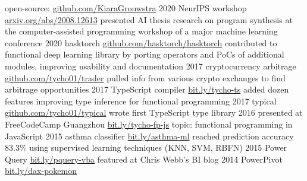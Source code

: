 \documentclass[]{friggeri-cv}
\begin{document}
\begin{entrylist}
\entry
    {}
    {open-source: }
    {\href{https://www.github.com/KiaraGrouwstra}{github.com/KiaraGrouwstra}}
    {}
   \entry
     {2020}
     {NeurIPS workshop}
     {\href{https://arxiv.org/abs/2008.12613}{arxiv.org/abs/2008.12613}}
     {
         presented AI thesis research on program synthesis at the computer-assisted programming workshop of a major machine learning conference
     }
  \entry
    {2020}
    {hasktorch}
    {\href{https://github.com/hasktorch/hasktorch}{github.com/hasktorch/hasktorch}}
    {
      contributed to functional deep learning library by porting operators and PoCs of additional modules, improving usability and documentation
    }
  \entry
    {2017}
    {cryptocurrency arbitrage}
    {\href{https://github.com/KiaraGrouwstra/trader}{github.com/tycho01/trader}}
    {
      pulled info from various crypto exchanges to find arbitrage opportunities
    }
  \entry
    {2017}
    {TypeScript compiler}
    {\href{https://github.com/Microsoft/TypeScript/pulls/KiaraGrouwstra}{bit.ly/tycho-ts}}
    {
      added dozen features improving type inference for functional programming
    }
  \entry
    {2017}
    {typical}
    {\href{https://github.com/KiaraGrouwstra/typical}{github.com/tycho01/typical}}
    {
      wrote first TypeScript type library
    }
  \entry
    {2016}
    {%
presented at
      FreeCodeCamp Guangzhou
    }
    {\href{https://www.slideshare.net/TychoGrouwstra/fp-in-js}{bit.ly/tycho-fp-js}}
    {topic: functional programming in JavaScript}
  \entry
    {2015}
    {%
asthma
      classifier
      \normalfont{}
    }
    {\href{http://bit.ly/asthma-ml}{bit.ly/asthma-ml}}
    {
      reached prediction accuracy 83.3\% using supervised learning techniques (KNN, SVM, RBFN)
    }
  \entry
    {2015}
    {%
Power Query 
    }
    {\href{https://blog.crossjoin.co.uk/2015/06/10/power-queryexcel-2016-vba-examples/}{bit.ly/pquery-vba}}
    {
      featured at
      Chris Webb's BI blog
    }
  \entry
    {2014}
    {%
PowerPivot 
    }
    {\href{https://powerpivotpro.com/2014/02/optimal-set-selection-power-pivot-does-pokemon-and-my-brain-just-exploded/}{bit.ly/dax-pokemon}}

\end{entrylist}
\end{document}
